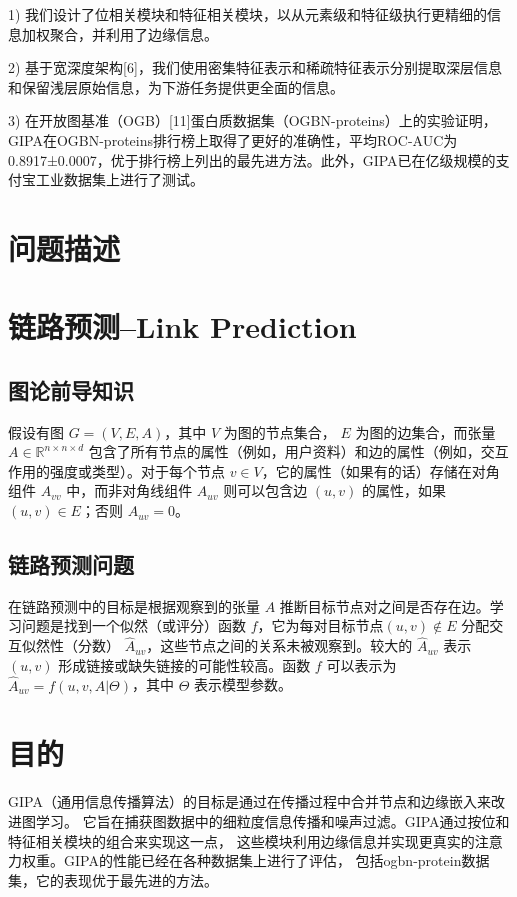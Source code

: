 \documentclass{article}
\begin{document}
1) 我们设计了位相关模块和特征相关模块，以从元素级和特征级执行更精细的信息加权聚合，并利用了边缘信息。

2) 基于宽深度架构[6]，我们使用密集特征表示和稀疏特征表示分别提取深层信息和保留浅层原始信息，为下游任务提供更全面的信息。

3) 在开放图基准（OGB）[11]蛋白质数据集（OGBN-proteins）上的实验证明，GIPA在OGBN-proteins排行榜上取得了更好的准确性，平均ROC-AUC为0.8917±0.0007，优于排行榜上列出的最先进方法。此外，GIPA已在亿级规模的支付宝工业数据集上进行了测试。
\section*{问题描述}


\section*{链路预测--Link Prediction}
\subsection*{图论前导知识}
假设有图 $G = (V, E, A)$，其中 $V$ 为图的节点集合，
$E$ 为图的边集合，而张量 $A \in \mathbb{R}^{n \times n \times d}$ 
包含了所有节点的属性（例如，用户资料）和边的属性（例如，交互作用的强度或类型）。对于每个节点 $v \in V$，它的属性（如果有的话）存储在对角组件 $A_{vv}$ 中，而非对角线组件 $A_{uv}$ 则可以包含边 $(u, v)$ 的属性，如果 $(u, v) \in E$；否则 $A_{uv} = 0$。
\subsection*{链路预测问题}
在链路预测中的目标是根据观察到的张量 $A$ 推断目标节点对之间是否存在边。学习问题是找到一个似然（或评分）函数 $f$，它为每对目标节点$(u, v) \notin E$ 分配交互似然性（分数） $\hat{A}_{uv}$，这些节点之间的关系未被观察到。较大的 $\hat{A}_{uv}$ 表示 $(u, v)$ 形成链接或缺失链接的可能性较高。函数 $f$ 可以表示为 $\hat{A}_{uv} = f(u, v, A|\Theta)$，其中 $\Theta$ 表示模型参数。
\section*{目的}
GIPA（通用信息传播算法）的目标是通过在传播过程中合并节点和边缘嵌入来改进图学习。
它旨在捕获图数据中的细粒度信息传播和噪声过滤。GIPA通过按位和特征相关模块的组合来实现这一点，
这些模块利用边缘信息并实现更真实的注意力权重。GIPA的性能已经在各种数据集上进行了评估，
包括ogbn-protein数据集，它的表现优于最先进的方法。
\end{document}
